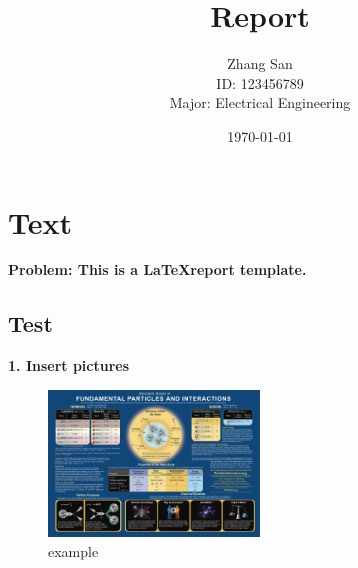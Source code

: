 \documentclass[10pt]{article} %
\title{Report}
\author{
{Zhang San}\\
\normalsize ID: 123456789\\
\normalsize Major: Electrical Engineering
}
\date{\today} %
\begin{document}
\maketitle

\begin{center}
\end{center}

\vspace{1cm}

\section{Text}
\textbf{Problem: This is a \LaTeX\;report template.}\\[10pt]

\subsection{Test}
\textbf{1. Insert pictures}
\begin{figure}[H] %
  \centering
  \includegraphics[width=0.5\textwidth]{eg1.jpg}
  \caption{example}\label{}
\end{figure}
\end{document}
